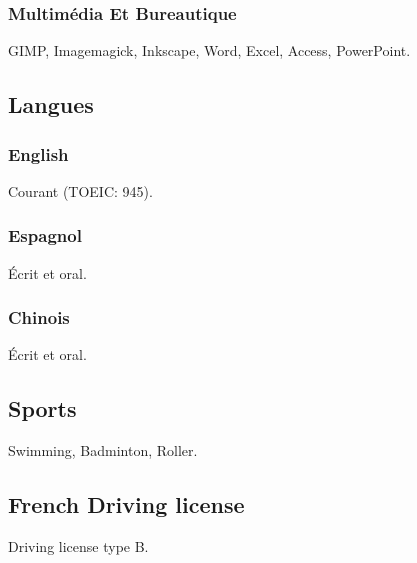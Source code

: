 \documentclass{article}
\begin{document}
\begin{multicols}{2}
                \subsubsection{Multim\'edia Et Bureautique}
                    GIMP, Imagemagick, Inkscape, Word, Excel, Access, PowerPoint.
            \subsection{Langues}
                \subsubsection{English}
                    Courant (TOEIC: 945).
                \subsubsection{Espagnol}
                    \'Ecrit et oral.
                \subsubsection{Chinois}
                    \'Ecrit et oral.
                \subsection{Sports}
                    Swimming, Badminton, Roller.
                \subsection{French Driving license}
                 Driving license type B.
    \end{multicols}
\end{document}
